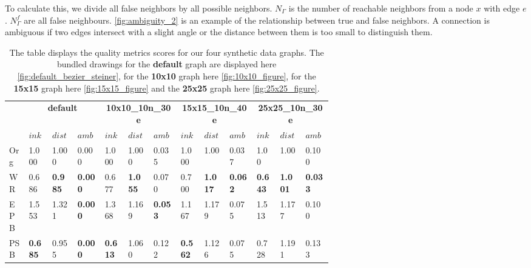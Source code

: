 To calculate this, we divide all false neighbors by all possible neighbors. $N_{\Gamma}$ is the number of reachable neighbors from a node $x$ with edge $e$. $N_{\Gamma}^f$ are all false neighbours. \autoref{fig:ambiguity_2} is an example of the relationship between true and false neighbors.
A connection is ambiguous if two edges intersect with a slight angle or the distance between them is too small to distinguish them.
\begin{table}[tb]
  \centering
  \setlength\tabcolsep{5pt} %
  \caption{
    \label{tab:quality}
    The table displays the quality metrics scores for our four synthetic data graphs. The bundled drawings for the \textbf{default} graph are displayed here \autoref{fig:default_bezier_steiner}, for the \textbf{10x10} graph here \autoref{fig:10x10_figure}, for the \textbf{15x15} graph here \autoref{fig:15x15_figure} and the \textbf{25x25} graph here \autoref{fig:25x25_figure}.
  }  
  \begin{tabular}{p{0.045\linewidth} || p{0.045\linewidth} p{0.045\linewidth} p{0.055\linewidth} | p{0.045\linewidth} p{0.045\linewidth} p{0.055\linewidth} | p{0.045\linewidth} p{0.045\linewidth} p{0.055\linewidth} | p{0.045\linewidth} p{0.045\linewidth} p{0.055\linewidth}}
    \toprule
     & \multicolumn{3}{c|}{\bfseries default} & \multicolumn{3}{c|}{\bfseries 10x10\_10n\_30e} & \multicolumn{3}{c|}{\bfseries 15x15\_10n\_40e} & \multicolumn{3}{c}{\bfseries 25x25\_10n\_30e}\\
     & $ink$ & $dist$ & $amb$ & $ink$ & $dist$ & $amb$ & $ink$ & $dist$ & $amb$ & $ink$ & $dist$ & $amb$ \\
    \midrule
    Org & 1.000 & 1.000 & 0.000 & 1.000 & 1.000 & 0.035 & 1.000 & 1.00 & 0.037 & 1.00 & 1.00 & 0.100 \\
    WR & 0.686 & \textbf{0.985} & \textbf{0.000} & 0.677 & \textbf{1.055} & 0.070 & 0.700 & \textbf{1.017} & \textbf{0.062} & \textbf{0.643} & \textbf{1.001} & \textbf{0.033} \\
    EPB & 1.553 & 1.321 & \textbf{0.000} & 1.368 & 1.169 & \textbf{0.053} & 1.167 & 1.179 & 0.075 & 1.513 & 1.177 & 0.100 \\
    PSB & \textbf{0.685} & 0.955 & \textbf{0.000} & \textbf{0.613} & 1.060 & 0.122 & \textbf{0.562} & 1.126 & 0.075 & 0.728 & 1.191 & 0.133 \\
    \bottomrule
  \end{tabular}
\end{table}

